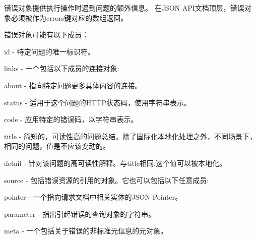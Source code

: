 错误对象提供执行操作时遇到问题的额外信息。 在JSON API文档顶层，错误对象必须被作为errors键对应的数组返回。

错误对象可能有以下成员：

\begin{compactitem}
\item id - 特定问题的唯一标识符。
\item links - 一个包括以下成员的连接对象:

\begin{compactenum}
\item about - 指向特定问题更多具体内容的连接。
\end{compactenum}

\item status - 适用于这个问题的HTTP状态码，使用字符串表示。
\item code - 应用特定的错误码，以字符串表示。
\item title - 简短的，可读性高的问题总结。除了国际化本地化处理之外，不同场景下，相同的问题，值是不应该变动的。
\item detail - 针对该问题的高可读性解释。与title相同,这个值可以被本地化。
\item source - 包括错误资源的引用的对象。它也可以包括以下任意成员:

\begin{compactenum}
\item pointer - 一个指向请求文档中相关实体的JSON Pointer。
\item parameter - 指出引起错误的查询对象的字符串。
\end{compactenum}

\item meta - 一个包括关于错误的非标准元信息的元对象。
\end{compactitem}



\begin{lstlisting}[language=JavaScript]

\end{lstlisting}





\begin{lstlisting}[language=JavaScript]

\end{lstlisting}




\begin{lstlisting}[language=JavaScript]

\end{lstlisting}




